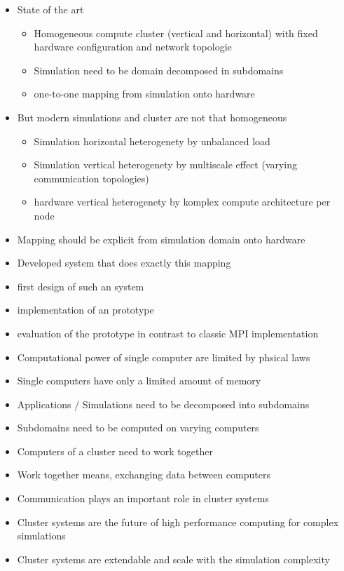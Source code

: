 \begin{itemize}
\item State of the art
  \begin{itemize}
  \item Homogeneous compute cluster (vertical and horizontal) with
    fixed hardware configuration and network topologie
  \item Simulation need to be domain decomposed in subdomains
  \item one-to-one mapping from simulation onto hardware
  \end{itemize}

\item But modern simulations and cluster are not that homogeneous
  \begin{itemize}
  \item Simulation horizontal heterogenety by unbalanced load
  \item Simulation vertical heterogenety by multiscale effect (varying communication topologies)
  \item hardware vertical heterogenety by komplex compute architecture per node
  \end{itemize}

\item Mapping should be explicit from simulation domain onto hardware

\item Developed system that does exactly this mapping

\item first design of such an system

\item implementation of an prototype

\item evaluation of the prototype in contrast to classic MPI implementation
\end{itemize}



\begin{itemize}
\item Computational power of single computer are limited by phsical
  laws
\item Single computers have only a limited amount of memory
\item Applications / Simulations need to be decomposed into subdomains
\item Subdomains need to be computed on varying computers
\item Computers of a cluster need to work together
\item Work together means, exchanging data between computers
\item Communication plays an important role in cluster systems
\item Cluster systems are the future of high performance computing for complex simulations
\item Cluster systems are extendable and scale with the simulation complexity
\end{itemize}

